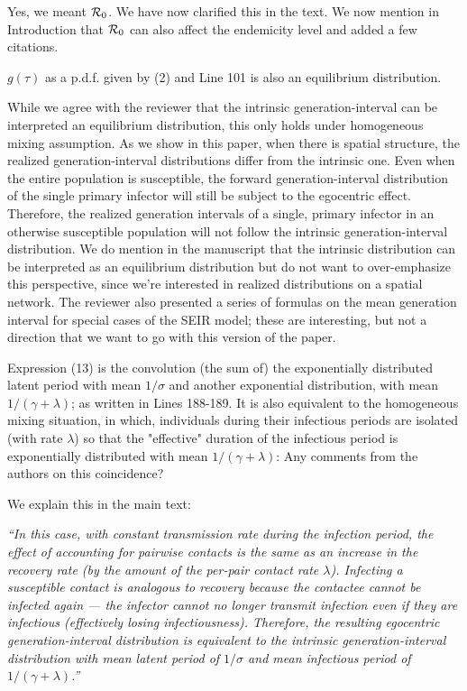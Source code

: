 \documentclass[12pt]{article}
\newcommand{\Rx}[1]{\ensuremath{{\cal R}_{#1}}}
\newcommand{\Ro}{\Rx{0}}
\newcommand{\revtext}{\textsf}
\newcommand{\newtext}[1]{\textsl{``#1''}}
\begin{document}
Yes, we meant $\Ro$. We have now clarified this in the text.
We now mention in Introduction that $\Ro$ can also affect the endemicity level and added a few citations.

\revtext{$g(\tau)$ as a p.d.f. given by (2) and Line 101 is also an equilibrium
distribution.}

While we agree with the reviewer that the intrinsic generation-interval can be interpreted an equilibrium distribution, this only holds under homogeneous mixing assumption. 
As we show in this paper, when there is spatial structure, the realized generation-interval distributions differ from the intrinsic one. 
Even when the entire population is susceptible, the forward generation-interval distribution of the single primary infector will still be subject to the egocentric effect.
Therefore, the realized generation intervals of a single, primary infector in an otherwise susceptible population will not follow the intrinsic generation-interval distribution. We do mention in the manuscript that the intrinsic distribution can be interpreted as an equilibrium distribution but do not want to over-emphasize this perspective, since we're interested in realized distributions on a spatial network.
The reviewer also presented a series of formulas on the mean generation interval for special cases of the SEIR model; these are interesting, but not a direction that we want to go with this version of the paper.

\revtext{
Expression (13) is the convolution (the sum of) the exponentially
distributed latent period with mean $1/\sigma$ and another exponential distribution, with mean $1/(\gamma+\lambda)$; as written in Lines 188-189. It is also equivalent
to the homogeneous mixing situation, in which, individuals during their
infectious periods are isolated (with rate $\lambda$) so that the "effective" duration
of the infectious period is exponentially distributed with mean $1/(\gamma + \lambda)$:
Any comments from the authors on this coincidence?
}

We explain this in the main text:

\newtext{In this case, with constant transmission rate during the infection period, the effect of accounting for pairwise contacts is the same as an increase in the recovery rate (by the amount of the per-pair contact rate $\lambda$). 
Infecting a susceptible contact is analogous to recovery because the contactee cannot be infected again --- the infector cannot no longer transmit infection even if they are infectious (effectively losing infectiousness).
Therefore, the resulting egocentric generation-interval distribution is equivalent to the intrinsic generation-interval distribution with mean latent period of $1/\sigma$ and mean infectious period of $1/(\gamma + \lambda)$.}
\end{document}

